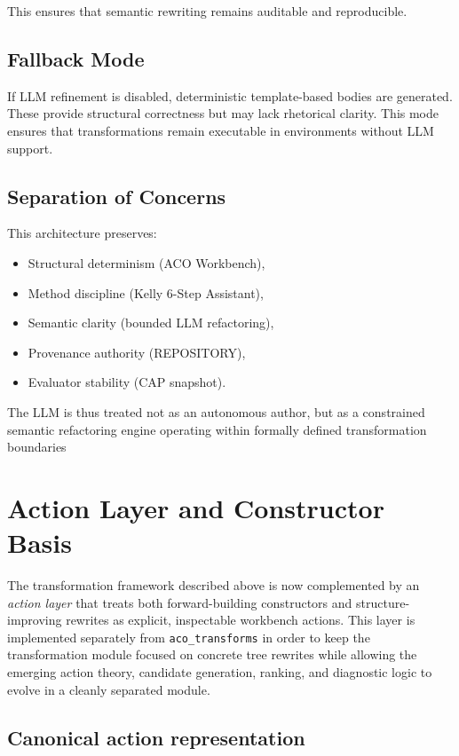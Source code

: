 \documentclass[12pt,twoside,a4paper]{article}
\begin{document}
This ensures that semantic rewriting remains auditable and reproducible.

\subsection{Fallback Mode}

If LLM refinement is disabled, deterministic template-based bodies are generated. These provide structural correctness but may lack rhetorical clarity. This mode ensures that transformations remain executable in environments without LLM support.

\subsection{Separation of Concerns}

This architecture preserves:

\begin{itemize}
  \item Structural determinism (ACO Workbench),
  \item Method discipline (Kelly 6-Step Assistant),
  \item Semantic clarity (bounded LLM refactoring),
  \item Provenance authority (REPOSITORY),
  \item Evaluator stability (CAP snapshot).
\end{itemize}

The LLM is thus treated not as an autonomous author, but as a constrained semantic refactoring engine operating within formally defined transformation boundaries

\clearpage
\section{Action Layer and Constructor Basis}

The transformation framework described above is now complemented by an \emph{action layer} that treats both forward-building constructors and structure-improving rewrites as explicit, inspectable workbench actions.
This layer is implemented separately from \texttt{aco\_transforms} in order to keep the transformation module focused on concrete tree rewrites while allowing the emerging action theory, candidate generation, ranking, and diagnostic logic to evolve in a cleanly separated module.

\subsection{Canonical action representation}
\end{document}
